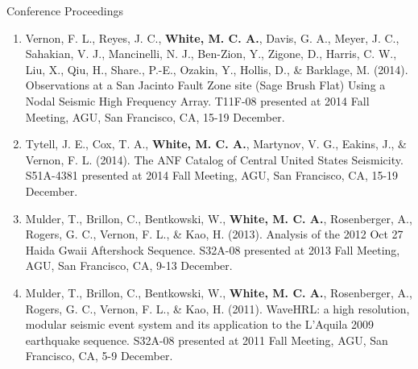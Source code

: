 \begin{rSection}{Conference Proceedings}
\begin{enumerate}
		\item Vernon, F. L., Reyes, J. C., \textbf{White, M. C. A.}, Davis, G. A., Meyer, J. C., Sahakian, V. J., Mancinelli, N. J., Ben-Zion, Y., Zigone, D., Harris, C. W., Liu, X., Qiu, H., Share., P.-E., Ozakin, Y., Hollis, D., \& Barklage, M. (2014). Observations at a San Jacinto Fault Zone site (Sage Brush Flat) Using a Nodal Seismic High Frequency Array. T11F-08 presented at 2014 Fall Meeting, AGU, San Francisco, CA, 15-19 December.
		
		\item Tytell, J. E., Cox, T. A., \textbf{White, M. C. A.}, Martynov, V. G., Eakins, J., \& Vernon, F. L. (2014). The ANF Catalog of Central United States Seismicity. S51A-4381 presented at 2014 Fall Meeting, AGU, San Francisco, CA, 15-19 December.
		
		\item Mulder, T., Brillon, C., Bentkowski, W., \textbf{White, M. C. A.}, Rosenberger, A., Rogers, G. C., Vernon, F. L., \& Kao, H. (2013). Analysis of the 2012 Oct 27 Haida Gwaii Aftershock Sequence. S32A-08 presented at 2013 Fall Meeting, AGU, San Francisco, CA, 9-13 December.

		\item Mulder, T., Brillon, C., Bentkowski, W., \textbf{White, M. C. A.}, Rosenberger, A., Rogers, G. C., Vernon, F. L., \& Kao, H. (2011). WaveHRL: a high resolution, modular seismic event system and its application to the L'Aquila 2009 earthquake sequence. S32A-08 presented at 2011 Fall Meeting, AGU, San Francisco, CA, 5-9 December.
	\end{enumerate}
\end{rSection}